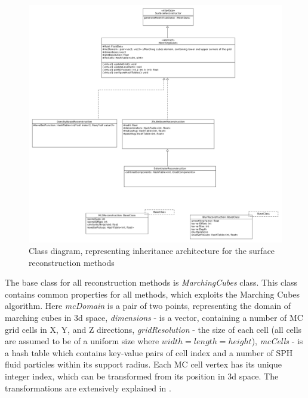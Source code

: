 \begin{figure}[H]
	\begin{center}
		\includegraphics[width=\textwidth]{figures/ClassDiagram.png}
	\end{center}
	\caption{Class diagram, representing inheritance architecture for the surface reconstruction methods}
    \label{fig:class-diagam}
\end{figure}
The base class for all reconstruction methods is \emph{MarchingCubes} class. This class contains common properties for all methods, which exploits the Marching Cubes algorithm. Here \emph{mcDomain} is a pair of two points, representing the domain of marching cubes in 3d space, \emph{dimensions} - is a vector, containing a number of MC grid cells in X, Y, and Z directions, \emph{gridResolution} - the size of each cell (all cells are assumed to be of a uniform size where $width=length=height$), \emph{mcCells} - is a hash table which contains key-value pairs of cell index and a number of SPH fluid particles within its support radius. Each MC cell vertex has its unique integer index, which can be transformed from its position in 3d space. The transformations are extensively explained in \cite{Akinchi}. 

